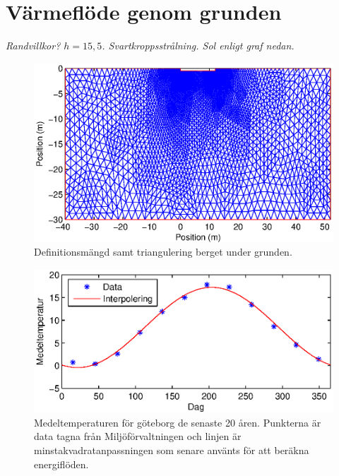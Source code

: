 \section{Värmeflöde genom grunden}

\emph{\color{red} Randvillkor? $h=15,5$. Svartkroppsstrålning. Sol enligt graf nedan.}

\begin{figure}
\centering
\includegraphics{images/trifoundation.eps}
\caption{Definitionsmängd samt triangulering berget under grunden.}
\end{figure}


\begin{figure}
\centering
\includegraphics{images/meantemperature.eps}
\caption{
Medeltemperaturen för göteborg de senaste 20 åren. Punkterna är data tagna från Miljöförvaltningen och linjen är minstakvadratanpassningen som senare använts för att beräkna energiflöden.}
\end{figure}

